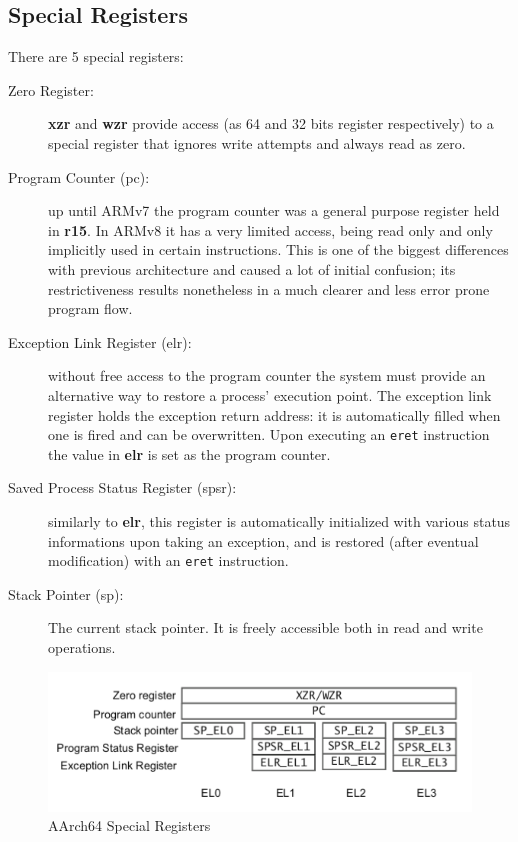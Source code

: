 \documentclass[12pt,a4paper,openright,twoside]{report}
\begin{document}
\subsection{Special Registers}
\label{spsr}
There are 5 special registers:
\begin{description}
    \item[Zero Register:] \textbf{xzr} and \textbf{wzr} provide access (as 64 and
        32 bits register respectively) to a special register that ignores write
        attempts and always read as zero.
    \item[Program Counter (pc):] up until ARMv7 the program counter was a general purpose
        register held in \textbf{r15}. In ARMv8 it has a very limited access,
        being read only and only implicitly used in certain instructions. This is 
        one of the biggest differences with previous architecture and caused a 
        lot of initial confusion; its restrictiveness results nonetheless in a
        much clearer and less error prone program flow.
    \item[Exception Link Register (elr):] without free access to the program counter
        the system must provide an alternative way to restore a process' execution
        point. The exception link register holds the exception return address: it 
        is automatically filled when one is fired and can be overwritten. Upon
        executing an {\tt eret} instruction the value in \textbf{elr} is set as the
        program counter.
    \item[Saved Process Status Register (spsr):] similarly to \textbf{elr}, this
        register is automatically initialized with various status informations
        upon taking an exception, and is restored (after eventual modification)
        with an {\tt eret} instruction.
    \item[Stack Pointer (sp):] The current stack pointer. It is freely accessible
        both in read and write operations.
\end{description}

\begin{figure}[t]
    \begin{center}
\includegraphics[scale=0.68]{images/tesi9.png}
\caption[special registers]{AArch64 Special Registers}\label{fig:specialreg}
    \end{center}
\end{figure}
\end{document}
